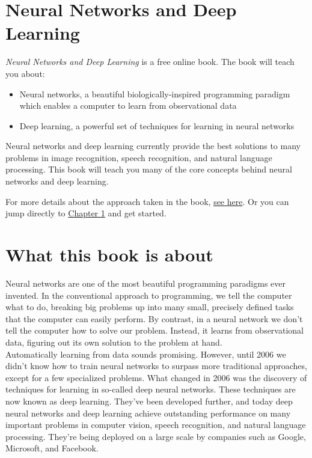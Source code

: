 \chapter*{Neural Networks and Deep Learning}
\label{chap: Intro}
\textit{Neural Networks and Deep Learning} is a free online book. The book will teach you about:
\begin{itemize}
\item Neural networks, a beautiful biologically-inspired programming paradigm which enables a computer to learn from observational data
\item Deep learning, a powerful set of techniques for learning in neural networks
\end{itemize}

Neural networks and deep learning currently provide the best solutions to many problems in image recognition, speech recognition, and natural language processing. This book will teach you many of the core concepts behind neural networks and deep learning.

For more details about the approach taken in the book, \hyperref[chap: About]{see here}. Or you can jump directly to \hyperref[chap: NN Handwriting]{Chapter 1} and get started.
\newpage
\chapter*{What this book is about}
\label{chap: About}
Neural networks are one of the most beautiful programming paradigms ever invented. In the conventional approach to programming, we tell the computer what to do, breaking big problems up into many small, precisely defined tasks that the computer can easily perform. By contrast, in a neural network we don't tell the computer how to solve our problem. Instead, it learns from observational data, figuring out its own solution to the problem at hand.\\

Automatically learning from data sounds promising. However, until 2006 we didn't know how to train neural networks to surpass more traditional approaches, except for a few specialized problems. What changed in 2006 was the discovery of techniques for learning in so-called deep neural networks. These techniques are now known as deep learning. They've been developed further, and today deep neural networks and deep learning achieve outstanding performance on many important problems in computer vision, speech recognition, and natural language processing. They're being deployed on a large scale by companies such as Google, Microsoft, and Facebook.\\

